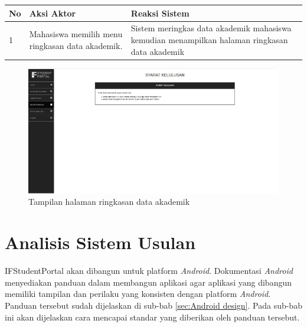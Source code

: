 \begin{enumerate}
\begin{itemize}
			\begin{tabular}{|p{0.5cm} |p{6cm}| p{6cm}|}
						\hline
							No 	& Aksi Aktor & Reaksi Sistem \\ \hline
							1 	& Mahasiswa memilih menu ringkasan data akademik. 	&	Sistem meringkas data akademik mahasiswa kemudian menampilkan halaman ringkasan data akademik \\ \hline 
						\end{tabular} 
		\end{itemize}
		\begin{figure}[H]
				\centering
				\includegraphics[scale=0.7]{Gambar/ringkasan}
				\caption{Tampilan halaman ringkasan data akademik} 
				\label{fig:ifstudpor_ringkasan}
			\end{figure}
\end{enumerate}


\section{Analisis Sistem Usulan}
IFStudentPortal akan dibangun untuk platform \textit{Android}. Dokumentasi \textit{Android} menyediakan panduan dalam membangun aplikasi agar aplikasi yang dibangun memiliki tampilan dan perilaku yang konsisten dengan platform \textit{Android}. Panduan tersebut sudah dijelaskan di sub-bab \ref{sec:Android design}. Pada sub-bab ini akan dijelaskan cara mencapai standar yang diberikan oleh panduan tersebut.

